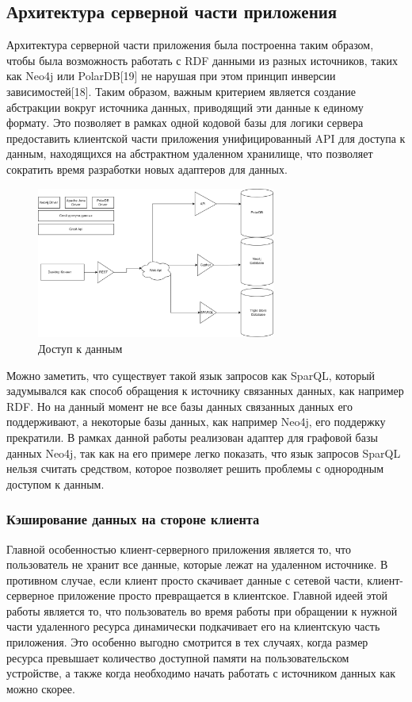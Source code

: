 \documentclass[12pt]{article}
\begin{document}
\subsection{Архитектура серверной части приложения}
\qquad Архитектура серверной части приложения была построенна таким образом, чтобы была возможность работать с RDF данными из разных источников, таких как Neo4j или PolarDB[19] не нарушая при этом принцип инверсии зависимостей[18]. Таким образом, важным критерием является создание абстракции вокруг источника данных, приводящий эти данные к единому формату. Это позволяет в рамках одной кодовой базы для логики сервера предоставить клиентской части приложения унифицированный API для доступа к данным, находящихся на  абстрактном удаленном хранилище, что позволяет сократить время разработки новых адаптеров для данных.

\begin{figure}[!ht]
    \centering
    \includegraphics[width=0.7\textwidth]{_images/data_access.png}
    \caption{Доступ к данным}
    \label{fig:data_access}
\end{figure}

Можно заметить, что существует такой язык запросов как SparQL, который задумывался как способ обращения к источнику связанных данных, как например RDF. Но на данный момент не все базы данных связанных данных его поддерживают, а некоторые базы данных, как например Neo4j, его поддержку прекратили. В рамках данной работы реализован адаптер для графовой базы данных Neo4j, так как на его примере легко показать, что язык запросов SparQL нельзя считать средством, которое позволяет решить проблемы с однородным доступом к данным.

\subsubsection{Кэширование данных на стороне клиента}
\qquad Главной особенностью клиент-серверного приложения является то, что пользователь не хранит все данные, которые лежат на удаленном источнике. В противном случае, если клиент просто скачивает данные с сетевой части, клиент-серверное приложение просто превращается в клиентское. Главной идеей этой работы является то, что пользователь во время работы при обращении к нужной части удаленного ресурса динамически подкачивает его на клиентскую часть приложения. Это особенно выгодно смотрится в тех случаях, когда размер ресурса превышает количество доступной памяти на пользовательском устройстве, а также когда необходимо начать работать с источником данных как можно скорее.
\end{document}
